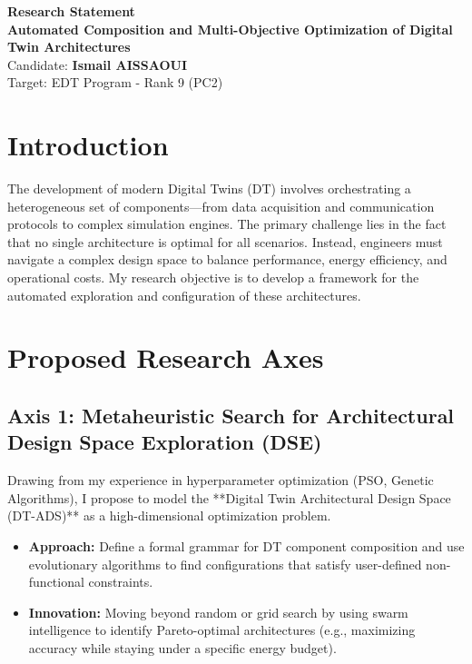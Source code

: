 \documentclass[a4paper,12pt]{article}
\begin{document}
\begin{center}
    {\LARGE \textbf{Research Statement}} \\
    \medskip
    {\large \textbf{Automated Composition and Multi-Objective Optimization of Digital Twin Architectures}} \\
    \medskip
    Candidate: \textbf{Ismail AISSAOUI} \\
    Target: EDT Program - Rank 9 (PC2)
\end{center}

\section{Introduction}
The development of modern Digital Twins (DT) involves orchestrating a heterogeneous set of components—from data acquisition and communication protocols to complex simulation engines. The primary challenge lies in the fact that no single architecture is optimal for all scenarios. Instead, engineers must navigate a complex design space to balance performance, energy efficiency, and operational costs. My research objective is to develop a framework for the automated exploration and configuration of these architectures.

\section{Proposed Research Axes}

\subsection{Axis 1: Metaheuristic Search for Architectural Design Space Exploration (DSE)}
Drawing from my experience in hyperparameter optimization (PSO, Genetic Algorithms), I propose to model the **Digital Twin Architectural Design Space (DT-ADS)** as a high-dimensional optimization problem. 
\begin{itemize}
    \item \textbf{Approach:} Define a formal grammar for DT component composition and use evolutionary algorithms to find configurations that satisfy user-defined non-functional constraints.
    \item \textbf{Innovation:} Moving beyond random or grid search by using swarm intelligence to identify Pareto-optimal architectures (e.g., maximizing accuracy while staying under a specific energy budget).
\end{itemize}
\end{document}
